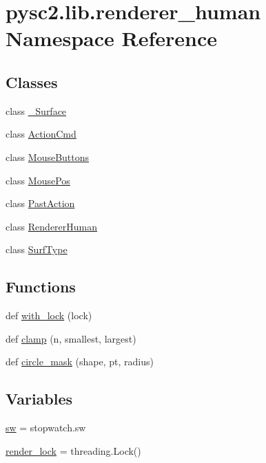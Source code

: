 \hypertarget{namespacepysc2_1_1lib_1_1renderer__human}{}\section{pysc2.\+lib.\+renderer\+\_\+human Namespace Reference}
\label{namespacepysc2_1_1lib_1_1renderer__human}
\subsection*{Classes}
\begin{DoxyCompactItemize}
\item 
class \mbox{\hyperlink{classpysc2_1_1lib_1_1renderer__human_1_1___surface}{\+\_\+\+Surface}}
\item 
class \mbox{\hyperlink{classpysc2_1_1lib_1_1renderer__human_1_1_action_cmd}{Action\+Cmd}}
\item 
class \mbox{\hyperlink{classpysc2_1_1lib_1_1renderer__human_1_1_mouse_buttons}{Mouse\+Buttons}}
\item 
class \mbox{\hyperlink{classpysc2_1_1lib_1_1renderer__human_1_1_mouse_pos}{Mouse\+Pos}}
\item 
class \mbox{\hyperlink{classpysc2_1_1lib_1_1renderer__human_1_1_past_action}{Past\+Action}}
\item 
class \mbox{\hyperlink{classpysc2_1_1lib_1_1renderer__human_1_1_renderer_human}{Renderer\+Human}}
\item 
class \mbox{\hyperlink{classpysc2_1_1lib_1_1renderer__human_1_1_surf_type}{Surf\+Type}}
\end{DoxyCompactItemize}
\subsection*{Functions}
\begin{DoxyCompactItemize}
\item 
def \mbox{\hyperlink{namespacepysc2_1_1lib_1_1renderer__human_ac8b75284cbccdee5fe651010cff8b0ba}{with\+\_\+lock}} (lock)
\item 
def \mbox{\hyperlink{namespacepysc2_1_1lib_1_1renderer__human_a7c996020daec061b02fc9323a98a7c7f}{clamp}} (n, smallest, largest)
\item 
def \mbox{\hyperlink{namespacepysc2_1_1lib_1_1renderer__human_a1c2b1e37eac77e0d171c8a38dacc9f7b}{circle\+\_\+mask}} (shape, pt, radius)
\end{DoxyCompactItemize}
\subsection*{Variables}
\begin{DoxyCompactItemize}
\item 
\mbox{\hyperlink{namespacepysc2_1_1lib_1_1renderer__human_a525c0fe2d94497910def33790b2de7bb}{sw}} = stopwatch.\+sw
\item 
\mbox{\hyperlink{namespacepysc2_1_1lib_1_1renderer__human_a635b7ec9724fdd7abf92a897cc68d1a3}{render\+\_\+lock}} = threading.\+Lock()
\end{DoxyCompactItemize}


